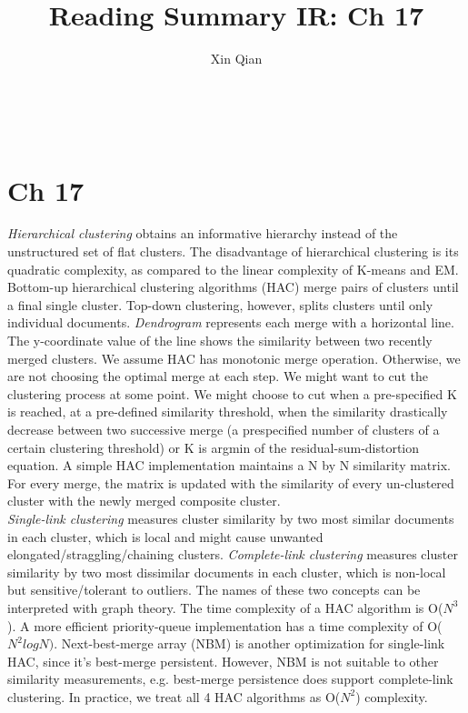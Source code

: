 \documentclass{sig-alternate-05-2015}
\begin{document}
\title{Reading Summary IR: Ch 17}
\author{
\alignauthor
Xin Qian\\
      \\
       \\
       \\
}
\maketitle

\section{Ch 17}
\textit{Hierarchical clustering} obtains an informative hierarchy instead of the unstructured set of flat clusters. The disadvantage of hierarchical clustering is its quadratic complexity, as compared to the linear complexity of K-means and EM.  \\
Bottom-up hierarchical clustering algorithms (HAC) merge pairs of clusters until a final single cluster. Top-down clustering, however, splits clusters until only individual documents. \textit{Dendrogram} represents each merge with a horizontal line. The y-coordinate value of the line shows the similarity between two recently merged clusters. We assume HAC has monotonic merge operation. Otherwise, we are not choosing the optimal merge at each step. We might want to cut the clustering process at some point. We might choose to cut when a pre-specified K is reached, at a pre-defined similarity threshold, when the similarity drastically decrease between two successive merge (a prespecified number of clusters of a certain clustering threshold) or K is argmin of the residual-sum-distortion equation. A simple HAC implementation maintains a N by N similarity matrix. For every merge, the matrix is updated with the similarity of every un-clustered cluster with the newly merged composite cluster. \\
\textit{Single-link clustering} measures cluster similarity by two most similar documents in each cluster, which is local and might cause unwanted elongated/straggling/chaining clusters. \textit{Complete-link clustering} measures cluster similarity by two most dissimilar documents in each cluster, which is non-local but sensitive/tolerant to outliers. The names of these two concepts can be interpreted with graph theory. The time complexity of a HAC algorithm is O($N^3$). A more efficient priority-queue implementation has a time complexity of O($N^2logN)$. Next-best-merge array (NBM) is another optimization for single-link HAC, since it's best-merge persistent. However, NBM is not suitable to other similarity measurements, e.g. best-merge persistence does support complete-link clustering. In practice, we treat all 4 HAC algorithms as O($N^2$) complexity. \\
\end{document}
